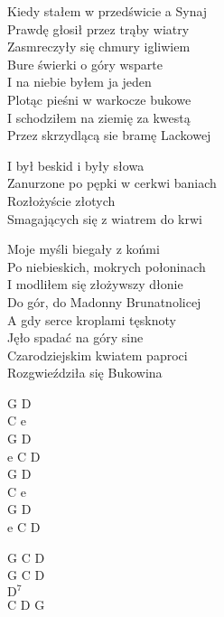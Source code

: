 
\begin{text}
    Kiedy stałem w przedświcie a Synaj\\
    Prawdę głosił przez trąby wiatry\\
    Zasmreczyły się chmury igliwiem\\
    Bure świerki o góry wsparte\\
    I na niebie byłem ja jeden\\
    Plotąc pieśni w warkocze bukowe\\
    I schodziłem na ziemię za kwestą\\
    Przez skrzydlącą sie bramę Lackowej

    \vin I był beskid i były słowa\\
    \vin Zanurzone po pępki w cerkwi baniach\\
    \vin Rozłożyście złotych\\
    \vin Smagających się z wiatrem do krwi

    Moje myśli biegały z końmi\\
    Po niebieskich, mokrych połoninach\\
    I modliłem się złożywszy dłonie\\
    Do gór, do Madonny Brunatnolicej\\
    A gdy serce kroplami tęsknoty\\
    Jęło spadać na góry sine\\
    Czarodziejskim kwiatem paproci\\
    Rozgwieździła się Bukowina
\end{text}
\begin{chord}
    G D\\
    C e\\
    G D\\
    e C D\\
    G D\\
    C e\\
    G D\\
    e C D

    G C D\\
    G C D\\
    $\mathrm{D^{7}}$\\
    C D G
\end{chord}
